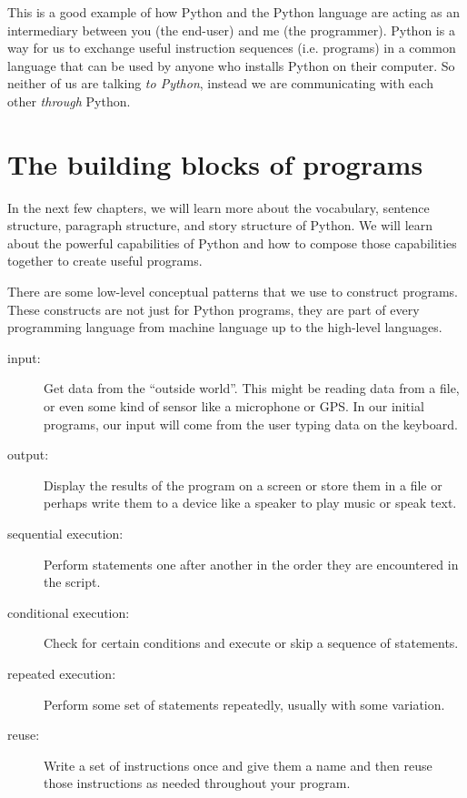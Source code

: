 This is a good example of how Python and the Python language are acting as an intermediary
between you (the end-user) and me (the programmer).  Python is a way for us to exchange useful
instruction sequences (i.e. programs) in a common language that can be used by anyone who 
installs Python on their computer.  So neither of us are talking {\em to Python},
instead we are communicating with each other {\em through} Python.

\section{The building blocks of programs}

In the next few chapters, we will learn more about the vocabulary, sentence structure,
paragraph structure, and story structure of Python.  We will learn about the powerful
capabilities of Python and how to compose those capabilities together to create useful
programs.

There are some low-level conceptual patterns that we use to construct programs.  These
constructs are not just for Python programs, they are part of every programming language
from machine language up to the high-level languages.

\begin{description}

\item[input:] Get data from the ``outside world''.  This might be 
reading data from a file, or even some kind of sensor like 
a microphone or GPS.  In our initial programs, our input will come from the user
typing data on the keyboard.

\item[output:] Display the results of the program on a screen
or store them in a file or perhaps write them to a device like a
speaker to play music or speak text.

\item[sequential execution:] Perform statements one after
another in the order they are encountered in the script.

\item[conditional execution:] Check for certain conditions and
execute or skip a sequence of statements.

\item[repeated execution:] Perform some set of statements 
repeatedly, usually with
some variation.

\item[reuse:] Write a set of instructions once and give them a name
and then reuse those instructions as needed throughout your program.

\end{description}

